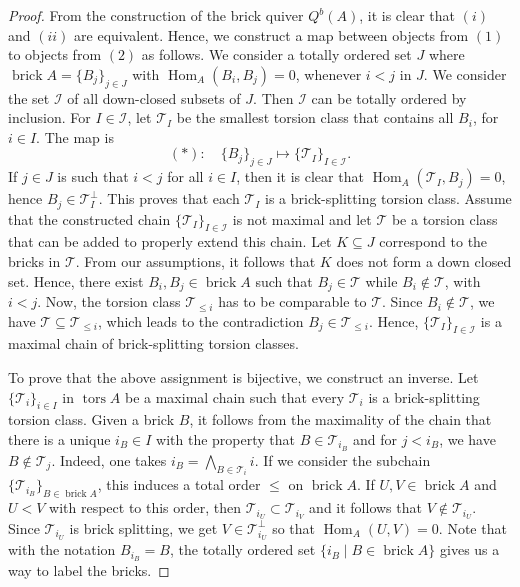 \documentclass{amsart}
\theoremstyle{thmstyle}
\theoremstyle{exstyle}
\theoremstyle{defstyle}
\theoremstyle{remstyle}
\theoremstyle{remstyle}
\newcommand{\Hom}{\operatorname{Hom}}
\DeclareMathOperator*{\brick}{brick}
\DeclareMathOperator*{\tors}{tors}
\begin{document}
\begin{proof}
From the construction of the brick quiver $Q^b(A)$, it is clear that $(i)$ and $(ii)$ are equivalent. Hence, we construct a map between objects from $(1)$ to objects from $(2)$ as follows. We consider a totally ordered set $J$ where $\brick A = \{B_j\}_{j \in J}$ with $\Hom_A(B_{i}, B_j)=0$, whenever $i < j$ in $J$. We consider the set $\mathcal{I}$ of all down-closed subsets of $J$. Then $\mathcal{I}$ can be totally ordered by inclusion. For $I \in \mathcal{I}$, let $\mathcal{T}_I$ be the smallest torsion class that contains all $B_i$, for $i \in I$. The map is
$$(*):\quad\{B_j\}_{j \in J} \mapsto \{\mathcal{T}_I\}_{I \in \mathcal{I}}.$$
If $j \in J$ is such that $i < j$ for all $i \in I$, then it is clear that $\Hom_A(\mathcal{T}_I, B_j)=0$, hence $B_j \in \mathcal{T}_I^\perp$. This proves that each $\mathcal{T}_I$ is a brick-splitting torsion class. Assume that the constructed chain $\{\mathcal{T}_I\}_{I \in \mathcal{I}}$ is not maximal and let $\mathcal{T}$ be a torsion class that can be added to properly extend this chain. Let $K \subseteq J$ correspond to the bricks in $\mathcal{T}$. From our assumptions, it follows that $K$ does not form a down closed set. Hence, there exist $B_i, B_j \in \brick A$ such that $B_j \in \mathcal{T}$ while $B_i \not \in \mathcal{T}$, with $i < j$. Now, the torsion class $\mathcal{T}_{\le i}$ has to be comparable to $\mathcal{T}$. Since $B_i \not\in \mathcal{T}$, we have $\mathcal{T} \subseteq\mathcal{T}_{\le i}$, which leads to the contradiction $B_j \in \mathcal{T}_{\le i}$. Hence, $\{\mathcal{T}_I\}_{I \in \mathcal{I}}$ is a maximal chain of brick-splitting torsion classes. 

To prove that the above assignment is bijective, we construct an inverse. Let $\{\mathcal{T}_i\}_{i\in I}$ in $\tors A$ be a maximal chain such that every $\mathcal{T}_i$ is a brick-splitting torsion class. Given a brick $B$, it follows from the maximality of the chain that there is a unique $i_B \in I$ with the property that $B \in \mathcal{T}_{i_B}$ and for $j < i_B$, we have $B \not \in \mathcal{T}_j$. Indeed, one takes $i_B = \bigwedge_{B \in \mathcal{T}_i} i$. If we consider the subchain $\{\mathcal{T}_{i_B}\}_{B \in \brick A}$, this induces a total order $\le$ on $\brick A$. If $U,V \in \brick A$ and $U < V$ with respect to this order, then $\mathcal{T}_{i_U} \subset \mathcal{T}_{i_V}$ and it follows that $V \not \in \mathcal{T}_{i_U}$. Since $\mathcal{T}_{i_U}$ is brick splitting, we get $V \in \mathcal{T}_{i_U}^\perp$ so that $\Hom_A(U,V)=0$. Note that with the notation $B_{i_B}=B$, the totally ordered set $\{i_B \mid B \in \brick A\}$ gives us a way to label the bricks. 


\end{proof}
\end{document}
